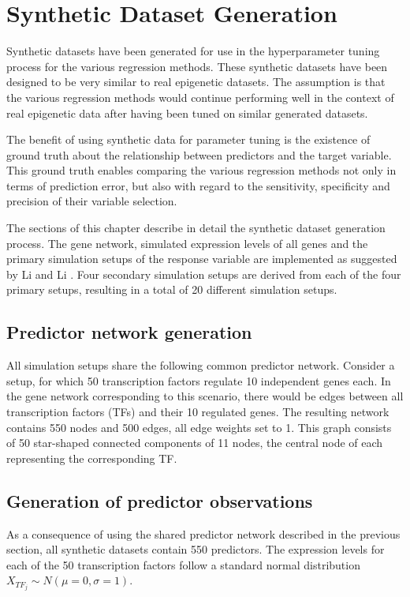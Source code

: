 \chapter{Synthetic Dataset Generation} \label{sec:datagen}
Synthetic datasets have been generated for use in the hyperparameter tuning process for the various regression methods. These synthetic datasets have been designed to be very similar to real epigenetic datasets. The assumption is that the various regression methods would continue performing well in the context of real epigenetic data after having been tuned on similar generated datasets.

The benefit of using synthetic data for parameter tuning is the existence of ground truth about the relationship between predictors and the target variable. This ground truth enables comparing the various regression methods not only in terms of prediction error, but also with regard to the sensitivity, specificity and precision of their variable selection.

The sections of this chapter describe in detail the synthetic dataset generation process. The gene network, simulated expression levels of all genes and the primary simulation setups of the response variable are implemented as suggested by Li and Li \cite{li2008network}. Four secondary simulation setups are derived from each of the four primary setups, resulting in a total of 20 different simulation setups.


\section{Predictor network generation} \label{sec:pred_net}
All simulation setups share the following common predictor network. Consider a setup, for which 50 transcription factors regulate 10 independent genes each. In the gene network corresponding to this scenario, there would be edges between all transcription factors (TFs) and their 10 regulated genes. The resulting network contains 550 nodes and 500 edges, all edge weights set to 1. This graph consists of 50 star-shaped connected components of 11 nodes, the central node of each representing the corresponding TF. 


\section{Generation of predictor observations} \label{sec:obs_gen}
As a consequence of using the shared predictor network described in the previous section, all synthetic datasets contain 550 predictors. The expression levels for each of the 50 transcription factors follow a standard normal distribution $X_{TF_j} \sim N(\mu = 0, \sigma = 1)$. 

